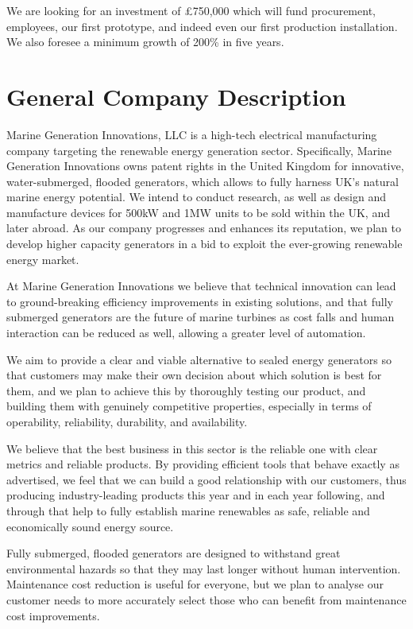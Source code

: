 \documentclass[a4paper,11pt]{article}
\begin{document}
We are looking for an investment of £750,000 which will fund procurement, employees, our first prototype, and indeed even our first production installation. We also foresee a minimum growth of 200\% in five years.
\pagebreak

\section{General Company Description}
Marine Generation Innovations, LLC is a high-tech electrical manufacturing company targeting the renewable energy generation sector. Specifically, Marine Generation Innovations owns patent rights in the United Kingdom for innovative, water-submerged, flooded generators, which allows to fully harness UK's natural marine energy potential. We intend to conduct research, as well as design and manufacture devices for 500kW and 1MW units to be sold within the UK, and later abroad. As our company progresses and enhances its reputation, we plan to develop higher capacity generators in a bid to exploit the ever-growing renewable energy market.

At Marine Generation Innovations we believe that technical innovation can lead to ground-breaking efficiency improvements in existing solutions, and that fully submerged generators are the future of marine turbines as cost falls and human interaction can be reduced as well, allowing a greater level of automation.

We aim to provide a clear and viable alternative to sealed energy generators so that customers may make their own decision about which solution is best for them, and we plan to achieve this by thoroughly testing our product, and building them with genuinely competitive properties, especially in terms of operability, reliability, durability, and availability.

We believe that the best business in this sector is the reliable one with clear metrics and reliable products. By providing efficient tools that behave exactly as advertised, we feel that we can build a good relationship with our customers, thus producing industry-leading products this year and in each year following, and through that help to fully establish marine renewables as safe, reliable and economically sound energy source.

Fully submerged, flooded generators are designed to withstand great environmental hazards so that they may last longer without human intervention. Maintenance cost reduction is useful for everyone, but we plan to analyse our customer needs to more accurately select those who can benefit from maintenance cost improvements.
\end{document}
